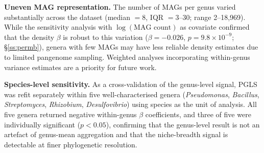 \documentclass[times]{zHenriquesLab-StyleBioRxiv}
\begin{document}
\textbf{Uneven MAG representation.} The number of MAGs per genus varied
substantially across the dataset (median $= 8$, IQR $= 3$--30; range
2--18{,}969). While the sensitivity analysis with $\log(\text{MAG count})$ as
covariate confirmed that the density $\beta$ is robust to this variation
($\beta = -0.026$, $p = 9.8 \times 10^{-9}$; \S\ref{ss:permb}), genera with few
MAGs may have less reliable density estimates due to limited pangenome sampling.
Weighted analyses incorporating within-genus variance estimates are a priority
for future work.

\textbf{Species-level sensitivity.} As a cross-validation of the genus-level
signal, PGLS was refit separately within five well-characterised genera
(\textit{Pseudomonas}, \textit{Bacillus}, \textit{Streptomyces},
\textit{Rhizobium}, \textit{Desulfovibrio}) using species as the unit of
analysis. All five genera returned negative within-genus $\beta$ coefficients, and
three of five were individually significant ($p < 0.05$), confirming that
the genus-level result is not an artefact of genus-mean aggregation and that
the niche-breadth signal is detectable at finer phylogenetic resolution.
\end{document}
